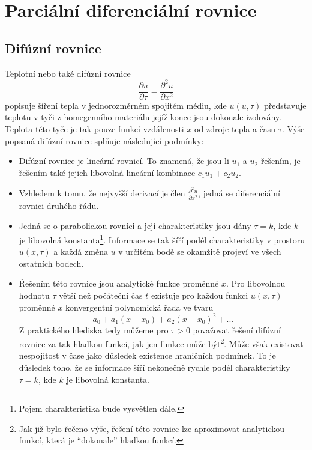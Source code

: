 \documentclass[a4paper]{book}
\begin{document}
\chapter{Parciální diferenciální rovnice}

\section{Difúzní rovnice}

Teplotní nebo také difúzní rovnice
\begin{equation}
\frac{\partial u}{\partial \tau} = \frac{\partial^2 u}{\partial x^2}
\end{equation}
popisuje šíření tepla v jednorozměrném spojitém médiu, kde $u(u, \tau)$ představuje teplotu v tyči z homegenního materiálu jejíž konce jsou dokonale izolovány. Teplota této tyče je tak pouze funkcí vzdálenosti $x$ od zdroje tepla a času $\tau$. Výše popsaná difúzní rovnice splňuje následující podmínky:
\begin{itemize}
\item Difúzní rovnice je lineární rovnicí. To znamená, že jsou-li $u_1$ a $u_2$ řešením, je řešením také jejich libovolná lineární kombinace $c_1 u_1 + c_2 u_2$.
\item Vzhledem k tomu, že nejvyšší derivací je člen $\frac{\partial^2 u}{\partial x^2}$, jedná se diferenciální rovnici druhého řádu.
\item Jedná se o parabolickou rovnici a její charakteristiky jsou dány $\tau = k$, kde $k$ je libovolná konstanta\footnote{Pojem charakteristika bude vysvětlen dále.}.  Informace se tak šíří podél charakteristiky v prostoru $u(x, \tau)$ a každá změna $u$ v určitém bodě se okamžitě projeví ve všech ostatních bodech.
\item Řešením této rovnice jsou analytické funkce proměnné $x$. Pro libovolnou hodnotu $\tau$ větší než počáteční čas $t$ existuje pro každou funkci $u(x, \tau)$ proměnné $x$ konvergentní polynomická řada ve tvaru
\begin{equation}
a_0 + a_1(x - x_0) + a_2(x - x_0)^2 + ...
\end{equation}
Z praktického hlediska tedy můžeme pro $\tau > 0$ považovat řešení difúzní rovnice za tak hladkou funkci, jak jen funkce může být\footnote{Jak již bylo řečeno výše, řešení této rovnice lze aproximovat analytickou funkcí, která je ``dokonale'' hladkou funkcí.}. Může však existovat nespojitost v čase jako důsledek existence hraničních podmínek. To je důsledek toho, že se informace šíří nekonečně rychle podél charakteristiky $\tau = k$, kde $k$ je libovolná konstanta.
\end{itemize}
\end{document}
